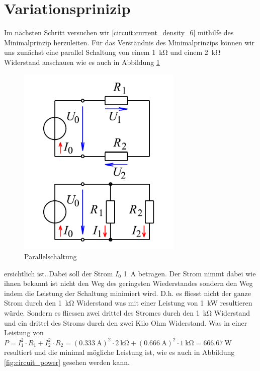 \section{Variationsprinizip}
Im nächsten Schritt versuchen wir \eqref{circuit:current_density_6} mithilfe des Minimalprinzip herzuleiten. Für das Verständnis des Minimalprinzips können wir uns zunächst eine parallel Schaltung von einem \SI{1}{\kilo\ohm} und einem \SI{2}{\kilo\ohm} Widerstand anschauen wie es auch in Abbildung \ref{fig:circuit_stromzweig} 
\begin{figure}
	\centering
	\includegraphics[trim={0 0 0 4.4cm},clip,width=0.7\textwidth]{papers/circuit/images/Schaltung_m-o_Stromzweig.pdf}
	\caption{Parallelschaltung \cite{wiki:stromzweig}}
	\label{fig:circuit_stromzweig}
\end{figure}
ersichtlich ist. Dabei soll der Strom $I_0$ \SI{1}{\ampere} betragen. Der Strom nimmt dabei wie ihnen bekannt ist nicht den Weg des geringsten Wiederstandes sondern den Weg indem die Leistung der Schaltung minimiert wird. D.h. es fliesst nicht der ganze Strom durch den \SI{1}{\kilo\ohm} Widerstand was mit einer Leistung von \SI{1}{\kilo\watt} resultieren würde. Sondern es fliessen zwei drittel des Stromes durch den \SI{1}{\kilo\ohm} Widerstand und ein drittel des Stroms durch den zwei Kilo Ohm Widerstand. Was in einer Leistung von $P=  I_1^2 \cdot R_1+  I_2^2 \cdot R_2 =(\SI{0.333}{\ampere})^2\cdot \SI{2}{\kilo\ohm}+(\SI{0.666}{\ampere})^2\cdot \SI{1}{\kilo\ohm} = \SI{666.67}{\watt}$ resultiert und die minimal mögliche Leistung ist, wie es auch in Abbildung \ref{fig:circuit_power} gesehen werden kann. 
